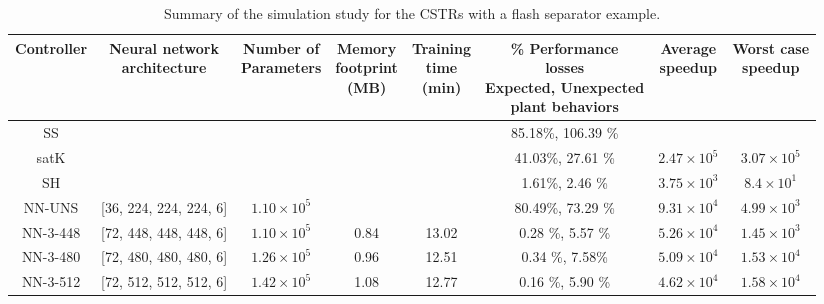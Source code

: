 \documentclass[preprint,5p, twocolumn, authoryear]{elsarticle}
\begin{document}
\begin{table}[t]
    \caption{Summary of the simulation study for the CSTRs with a flash
    separator example.}   
    \begin{tabular}{ |c|c|c|c|c|c|c|c| }
        \hline
        Controller & \thead{Neural network \\ architecture} & \thead{Number of
        \\ Parameters} & \thead{Memory \\ footprint \\ (MB)} & \thead{Training
        \\ time \\ (min)} & \thead{\% Performance\\ losses \\
        Expected, Unexpected \\ plant behaviors} & \thead{Average \\ speedup} &
        \thead{Worst case \\ speedup} \\
        \hline
    SS &  &  & &  & 85.18\%, 106.39 \% &  & \\ 
    satK &  &  &  &  & 41.03\%, 27.61 \% & $2.47 \times 10^5$ & $3.07 \times
    10^5$ \\ 
    SH &  &  &  &  & 1.61\%, 2.46 \% & $3.75 \times 10^3$ & $8.4 \times 10^1$ \\
    
    NN-UNS & [36, 224, 224, 224, 6] & $1.10 \times 10^5$ &  &  & 80.49\%, 73.29
    \% & $9.31 \times 10^4$ & $4.99 \times 10^3$ \\ 
NN-3-448 & [72, 448, 448, 448, 6] & $1.10 \times 10^5$ & 0.84 & 13.02 & 0.28 \%,
5.57 \% & $5.26 \times 10^4$ & $1.45 \times 10^3$ \\ 
NN-3-480 & [72, 480, 480, 480, 6]  & $1.26 \times 10^5$ & 0.96  & 12.51 & 0.34
\%, 7.58\% & $5.09 \times 10^4$ & $1.53 \times 10^4$ \\ 
NN-3-512 & [72, 512, 512, 512, 6]  & $1.42 \times 10^5$ & 1.08  & 12.77 & 0.16
\%, 5.90 \% & $4.62 \times 10^4$ & $1.58 \times 10^4$ \\ 
        \hline
       \end{tabular}
       \label{table:cstrs}      
\end{table}
\end{document}
